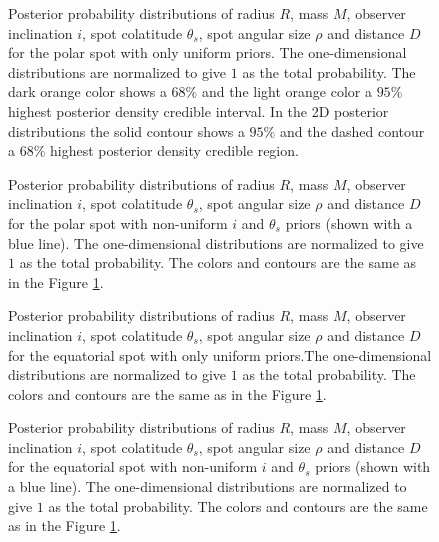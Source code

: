 \documentclass{wihuri}
\def\thetas{\theta_{s}}
\begin{document}
\begin{figure}
\centerline{}
\caption{Posterior probability distributions of radius $R$, mass $M$, observer inclination $i$, spot colatitude $\thetas$, spot angular size $\rho$ and distance $D$ for the polar spot with only uniform priors. The one-dimensional distributions are normalized to give $1$ as the total probability. The dark orange color shows a $68 \%$ and the light orange color a $95 \%$ highest posterior density credible interval. In the 2D posterior distributions the solid contour shows a $95 \%$ and the dashed contour a $68 \%$ highest posterior density credible region.  
\label{fig:polpost}}
\end{figure}

\begin{figure}
\centerline{}
\caption{Posterior probability distributions of radius $R$, mass $M$, observer inclination $i$, spot colatitude $\thetas$, spot angular size $\rho$ and distance $D$ for the polar spot with non-uniform $i$ and $\thetas$ priors (shown with a blue line). The one-dimensional distributions are normalized to give $1$ as the total probability. The colors and contours are the same as in the Figure \ref{fig:polpost}. 
\label{fig:polpostpr}}
\end{figure}



\begin{figure}
\centerline{}
\caption{Posterior probability distributions of radius $R$, mass $M$, observer inclination $i$, spot colatitude $\thetas$, spot angular size $\rho$ and distance $D$ for the equatorial spot with only uniform priors.The one-dimensional distributions are normalized to give $1$ as the total probability. The colors and contours are the same as in the Figure \ref{fig:polpost}.
\label{fig:eqpost}}
\end{figure}



\begin{figure}
\centerline{}
\caption{Posterior probability distributions of radius $R$, mass $M$, observer inclination $i$, spot colatitude $\theta_{s}$, spot angular size $\rho$ and distance $D$ for the equatorial spot with non-uniform $i$ and $\thetas$ priors (shown with a blue line). The one-dimensional distributions are normalized to give $1$ as the total probability. The colors and contours are the same as in the Figure \ref{fig:polpost}.
\label{fig:eqpostpr}}
\end{figure}
\end{document}
